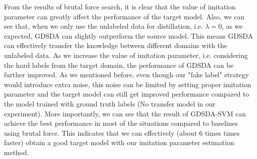 From the results of brutal force search, it is clear that the value of imitation parameter can greatly affect the performance of the target model.
Also, we can see that, when we only use the unlabeled data for distillation, i.e. $\lambda = 0$, as we expected, GDSDA can slightly outperform the source model. This means GDSDA can effectively transfer the knowledge between different domains with the unlabeled data. As we increase the value of imitation parameter, i.e. considering the hard labels from the target domain, the performance of GDSDA can be further improved. As we mentioned before, even though our "fake label" strategy would introduce extra noise, this noise can be limited by setting proper imitation parameter and the target model can still get improved performance compared to the model trained with ground truth labels (No transfer model in our experiment).
More importantly, we can see that the result of GDSDA-SVM can achieve the best performance in most of the situations compared to baselines using brutal force. This indicates that we can effectively (about 6 times times faster) obtain a good target model with our imitation parameter estimation method.
